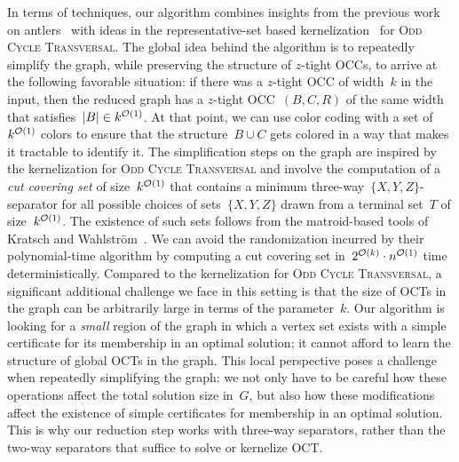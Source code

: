 In terms of techniques, our algorithm combines insights from the previous work on antlers~\cite{DonkersJ24} with ideas in the representative-set based kernelization~\cite{KratschW20} for \textsc{Odd Cycle Transversal}. The global idea behind the algorithm is to repeatedly simplify the graph, while preserving the structure of $z$-tight OCCs, to arrive at the following favorable situation: if there was a $z$-tight OCC of width~$k$ in the input, then the reduced graph has a $z$-tight OCC~$(B,C,R)$ of the same width that satisfies~$|B| \in k^{\mathcal{O}(1)}$. At that point, we can use color coding with a set of~$k^{\mathcal{O}(1)}$ colors to ensure that the structure~$B \cup C$ gets colored in a way that makes it tractable to identify it. The simplification steps on the graph are inspired by the kernelization for \textsc{Odd Cycle Transversal} and involve the computation of a \emph{cut covering set} of size~$k^{\mathcal{O}(1)}$ that contains a minimum three-way~$\{X,Y,Z\}$-separator
for all possible choices of sets~$\{X,Y,Z\}$ drawn from a terminal set~$T$ of size~$k^{\mathcal{O}(1)}$. The existence of such sets follows from the matroid-based tools of Kratsch and Wahlstr\"{o}m~\cite{KratschW20}. We can avoid the randomization incurred by their polynomial-time algorithm by computing a cut covering set in~$2^{\mathcal{O}(k)} \cdot n^{\mathcal{O}(1)}$ time deterministically. Compared to the kernelization for \textsc{Odd Cycle Transversal}, a significant additional challenge we face in this setting is that the size of OCTs in the graph can be arbitrarily large in terms of the parameter~$k$. Our algorithm is looking for a \emph{small} region of the graph in which a vertex set exists with a simple certificate for its membership in an optimal solution; it cannot afford to learn the structure of global OCTs in the graph. This local perspective poses a challenge when repeatedly simplifying the graph: we not only have to be careful how these operations affect the total solution size in~$G$, but also how these modifications affect the existence of simple certificates for membership in an optimal solution. This is why our reduction step works with three-way separators, rather than the two-way separators that suffice to solve or kernelize OCT.

